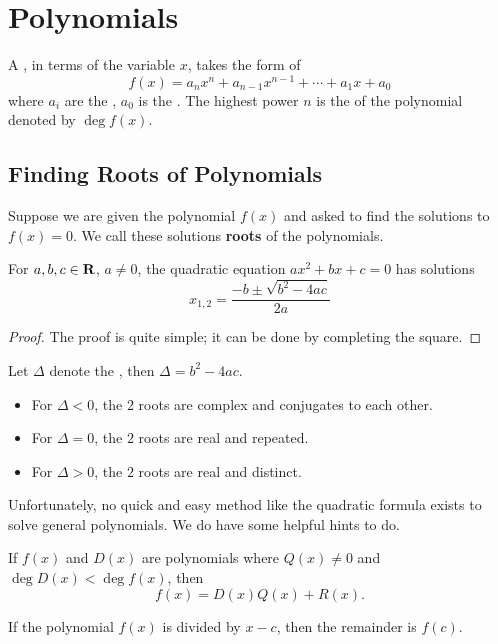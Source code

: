 \section{Polynomials}
A , in terms of the variable $x$, takes the form of 
\[ f(x)=a_nx^n+a_{n-1}x^{n-1}+\cdots+a_1x+a_0 \]
where $a_i$ are the , $a_0$ is the . The highest power $n$ is the  of the polynomial denoted by $\deg f(x)$.

\subsection{Finding Roots of Polynomials}
Suppose we are given the polynomial $f(x)$ and asked to find the solutions to $f(x)=0$. We call these solutions \textbf{roots} of the polynomials.

\begin{theorem} 
For $a,b,c\in\mathbf R$, $a\neq0$, the quadratic equation $ax^2+bx+c=0$ has solutions 
\begin{equation} x_{1,2}=\frac{-b\pm\sqrt{b^2-4ac}}{2a} \end{equation}
\end{theorem}

\begin{proof}
The proof is quite simple; it can be done by completing the square.
\end{proof}

Let $\Delta$ denote the , then $\Delta=b^2-4ac$.
\begin{itemize}
\item For $\Delta < 0$, the $2$ roots are complex and conjugates to each other.
\item For $\Delta=0$, the $2$ roots are real and repeated.
\item For $\Delta > 0$, the $2$ roots are real and distinct.
\end{itemize}

Unfortunately, no quick and easy method like the quadratic formula exists to solve general polynomials. We do have some helpful hints to do.

\begin{theorem}
If $f(x)$ and $D(x)$ are polynomials where $Q(x)\neq0$ and $\deg D(x)<\deg f(x)$, then
\[f(x)=D(x)Q(x)+R(x).\]
\end{theorem}

\begin{theorem} 
If the polynomial $f(x)$ is divided by $x-c$, then the remainder is $f(c)$.
\end{theorem}

